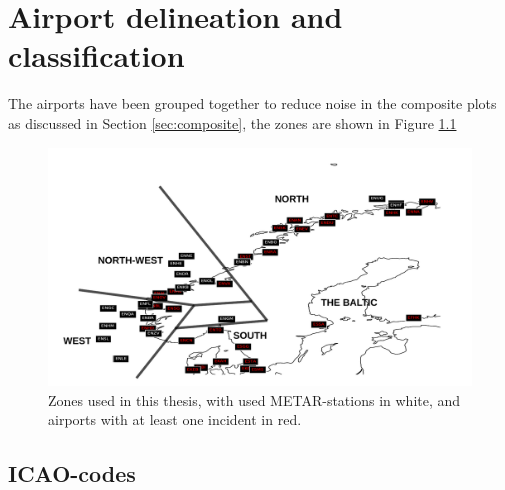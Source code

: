 \chapter{Airport delineation and classification}\label{app:B}
The airports have been grouped together to reduce noise in the composite plots as discussed in Section \ref{sec:composite}, the zones are shown in Figure \ref{fig:Stationsmap}
\begin{figure}
    \centering
    \includegraphics[width=\textwidth]{Figures/METARandHIT.pdf}
    \caption{Zones used in this thesis, with used METAR-stations in white, and airports with at least one incident in red.}
    \label{fig:Stationsmap}
\end{figure}

\section{ICAO-codes}

